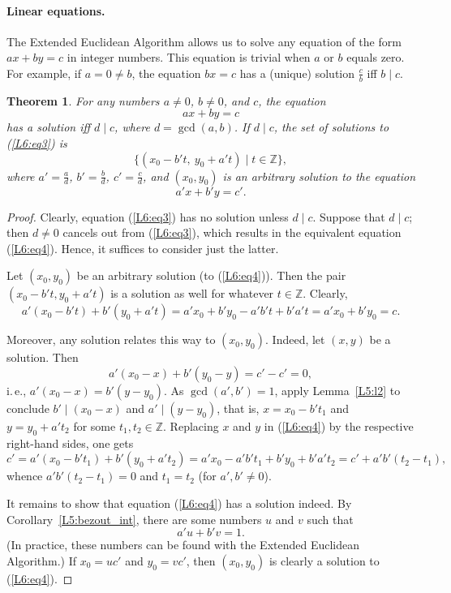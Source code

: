 \documentclass[12pt,notitlepage]{article}
\theoremstyle{plain}
\newtheorem{thm}{Theorem}[section]
\theoremstyle{definition}
\theoremstyle{plain}
\newcommand{\Z}{\mathbb{Z}}
\newcommand{\1}{\mathbf{1}}
\newcommand{\0}{\mathbf{0}}
\newcommand{\dvd}{\mathop{\mid}}
\begin{document}
\paragraph{Linear equations.} The Extended Euclidean Algorithm allows us to solve any equation of the form $a x + b y = c$ in integer numbers. This equation is trivial when $a$ or $b$ equals zero. For example, if $a = 0 \neq b$, the equation $b x = c$ has a (unique) solution $\frac{c}{b}$ iff $b \dvd c$.

\begin{thm}\label{L6:t_eq} For any numbers $a \neq 0$, $b \neq 0$, and $c$, the equation
\begin{equation}\label{L6:eq3}
a x + b y = c
\end{equation}
has a solution iff $d \dvd c$, where $d = \gcd(a, b)$. If $d \dvd c$, the set of solutions to (\ref{L6:eq3}) is
$$\{ (x_0 - b't,\ y_0 + a't) \mid t \in \Z \},$$
where $a' = \frac{a}{d}$, $b' = \frac{b}{d}$, $c' = \frac{c}{d}$, and $(x_0, y_0)$ is an arbitrary solution to the equation
\begin{equation}\label{L6:eq4}
a' x + b' y = c'.
\end{equation}
\end{thm}
\begin{proof}
Clearly, equation (\ref{L6:eq3}) has no solution unless $d \dvd c$. Suppose that $d \dvd c$; then $d \neq 0$ cancels out from (\ref{L6:eq3}), which results in the equivalent equation (\ref{L6:eq4}). Hence, it suffices to consider just the latter.

Let $(x_0, y_0)$ be an arbitrary solution (to (\ref{L6:eq4})). Then the pair $(x_0 - b't, y_0 + a't)$ is a solution as well for whatever $t \in \Z$. Clearly,
$$a'(x_0 - b't) + b'(y_0 + a't) = a'x_0 + b'y_0 - a'b't + b'a't = a'x_0 + b'y_0 = c.$$

Moreover, any solution relates this way to $(x_0, y_0)$. Indeed, let $(x, y)$ be a solution. Then
$$a'(x_0 - x) + b'(y_0 - y) = c' - c' = 0,$$
i.\,e., $a'(x_0 - x) = b'(y - y_0)$. As $\gcd(a', b') = 1$, apply Lemma~\ref{L5:l2} to conclude $b' \dvd (x_0 -  x)$ and $a' \dvd (y - y_0)$, that is, $x = x_0 - b't_1$ and $y = y_0 + a't_2$ for some $t_1, t_2 \in \Z$. Replacing $x$ and $y$ in (\ref{L6:eq4}) by the respective right-hand sides, one gets
$$c' = a'(x_0 - b't_1) + b'(y_0 + a't_2)  = a'x_0 - a'b't_1 + b'y_0 + b'a't_2 = c' + a'b'(t_2 - t_1),$$
whence $a'b'(t_2 - t_1) = 0$ and $t_1 = t_2$ (for $a', b' \neq 0$).

It remains to show that equation (\ref{L6:eq4}) has a solution indeed. By Corollary~\ref{L5:bezout_int}, there are some numbers $u$ and $v$ such that
$$a' u + b' v = 1.$$
(In practice, these numbers can be found with the Extended Euclidean Algorithm.) If $x_0 = uc'$ and $y_0 = vc'$, then $(x_0, y_0)$ is clearly a solution to (\ref{L6:eq4}).
\end{proof}
\end{document}

